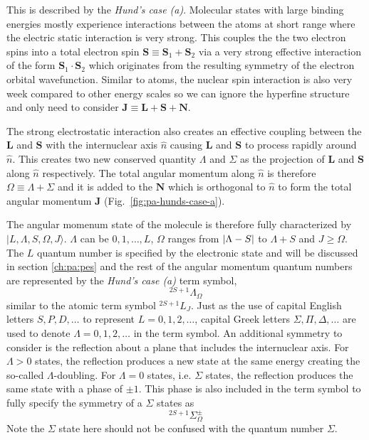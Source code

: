 This is described by the \textit{Hund's case (a)}.
Molecular states with large binding energies mostly experience interactions
between the atoms at short range where the electric static interaction is very strong.
This couples the the two electron spins into a total electron spin
$\mathbf{S}\equiv\mathbf{S}_1+\mathbf{S}_2$ via a very strong effective interaction
of the form $\mathbf{S}_1\cdot\mathbf{S}_2$ which originates
from the resulting symmetry of the electron orbital wavefunction.
Similar to atoms, the nuclear spin interaction is also very week compared to
other energy scales so we can ignore the hyperfine structure and only need to consider
$\mathbf{J}\equiv\mathbf{L}+\mathbf{S}+\mathbf{N}$.

The strong electrostatic interaction also creates an effective coupling
between the $\mathbf{L}$ and $\mathbf{S}$ with the internuclear axis $\hat{n}$
causing $\mathbf{L}$ and $\mathbf{S}$ to process rapidly around $\hat{n}$.
This creates two new conserved quantity $\Lambda$ and $\Sigma$
as the projection of $\mathbf{L}$ and $\mathbf{S}$
along $\hat{n}$ respectively.
The total angular momentum along $\hat{n}$ is therefore $\Omega\equiv\Lambda+\Sigma$
and it is added to the $\mathbf{N}$ which is orthogonal to $\hat{n}$ to form
the total angular momentum $\mathbf{J}$ (Fig.~\ref{fig:pa-hunds-case-a}).

The angular momenum state of the molecule is therefore fully characterized by
$|L,\Lambda,S,\Omega,J\rangle$. $\Lambda$ can be $0,1,\dots,L$, $\Omega$ ranges from
${\left|{\Lambda-S}\right|}$ to $\Lambda+S$ and $J\geqslant\Omega$.
The $L$ quantum number is specified by the electronic state and will be discussed
in section \ref{ch:pa:pes} and the rest of the angular momentum quantum numbers
are represented by the \textit{Hund's case (a)} term symbol,
\[ ^{2S+1}\Lambda_\Omega \]
similar to the atomic term symbol $^{2S+1}L_J$.
Just as the use of capital English letters $S,P,D,\dots$ to represent
$L=0,1,2,\dots$, capital Greek letters $\Sigma,\Pi,\Delta,\dots$ are used
to denote $\Lambda=0,1,2,\dots$ in the term symbol.
An additional symmetry to consider is the reflection about a plane that includes
the internuclear axis.
For $\Lambda>0$ states, the reflection produces a new state at the same energy
creating the so-called $\Lambda$-doubling. For $\Lambda=0$ states, i.e. $\Sigma$ states,
the reflection produces the same state with a phase of $\pm1$.
This phase is also included in the term symbol to fully specify the symmetry of
a $\Sigma$ states as
\[ ^{2S+1}\Sigma_\Omega^{\pm} \]
Note the $\Sigma$ state here should not be confused with the quantum number $\Sigma$.

